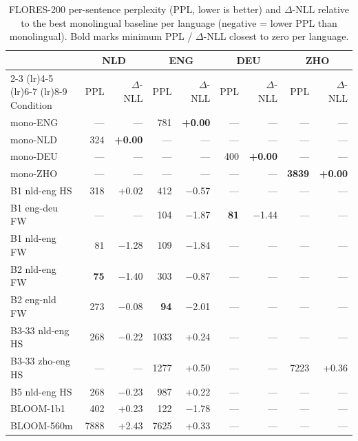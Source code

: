 \begin{table}[t]
  \centering
  \tiny
  \caption{\textsc{FLORES-200} per-sentence perplexity (PPL, lower is better) and $\Delta$-NLL relative to the best monolingual baseline per language (negative = lower PPL than monolingual). Bold marks minimum PPL / $\Delta$-NLL closest to zero per language.}
  \label{tab:flores_ppl}
  \begin{tabular}{lrrrrrrrr}
    \toprule
    & \multicolumn{2}{c}{NLD} & \multicolumn{2}{c}{ENG} & \multicolumn{2}{c}{DEU} & \multicolumn{2}{c}{ZHO} \\
    \cmidrule(lr){2-3} \cmidrule(lr){4-5} \cmidrule(lr){6-7} \cmidrule(lr){8-9}
    Condition & PPL & $\Delta$-NLL & PPL & $\Delta$-NLL & PPL & $\Delta$-NLL & PPL & $\Delta$-NLL \\
    \midrule
    mono-ENG       & ---  & ---     & 781  & \textbf{+0.00} & ---  & ---     & ---  & ---     \\
    mono-NLD       & 324  & \textbf{+0.00} & ---  & ---     & ---  & ---     & ---  & ---     \\
    mono-DEU       & ---  & ---     & ---  & ---     & 400  & \textbf{+0.00} & ---  & ---     \\
    mono-ZHO       & ---  & ---     & ---  & ---     & ---  & ---     & \textbf{3839} & \textbf{+0.00} \\
    B1 nld-eng HS  & 318  & +0.02   & 412  & $-$0.57 & ---  & ---     & ---  & ---     \\
    B1 eng-deu FW  & ---  & ---     & 104  & $-$1.87 & \textbf{81}   & $-$1.44 & ---  & ---     \\
    B1 nld-eng FW  & 81   & $-$1.28 & 109  & $-$1.84 & ---  & ---     & ---  & ---     \\
    B2 nld-eng FW  & \textbf{75} & $-$1.40 & 303  & $-$0.87 & ---  & ---     & ---  & ---     \\
    B2 eng-nld FW  & 273  & $-$0.08 & \textbf{94}   & $-$2.01 & ---  & ---     & ---  & ---     \\
    B3-33 nld-eng HS & 268 & $-$0.22 & 1033 & +0.24   & ---  & ---     & ---  & ---     \\
    B3-33 zho-eng HS & --- & ---    & 1277 & +0.50   & ---  & ---     & 7223 & +0.36   \\
    B5 nld-eng HS  & 268  & $-$0.23 & 987  & +0.22   & ---  & ---     & ---  & ---     \\
    BLOOM-1b1      & 402  & +0.23   & 122  & $-$1.78 & ---  & ---     & ---  & ---     \\
    BLOOM-560m     & 7888 & +2.43   & 7625 & +0.33   & ---  & ---     & ---  & ---     \\
    \bottomrule
  \end{tabular}
\end{table}


